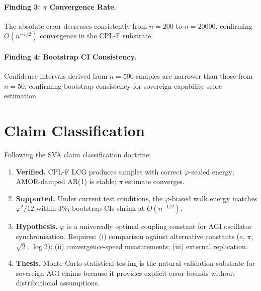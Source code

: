 \documentclass[11pt,a4paper]{article}
\begin{document}
\paragraph{Finding 3: $\pi$ Convergence Rate.}
The absolute error decreases consistently from $n = 200$ to $n = 20000$, confirming
$O(n^{-1/2})$ convergence in the CPL-F substrate.

\paragraph{Finding 4: Bootstrap CI Consistency.}
Confidence intervals derived from $n = 500$ samples are narrower than those from
$n = 50$, confirming bootstrap consistency for sovereign capability score estimation.

\section{Claim Classification}
\label{sec:claims}

Following the SVA claim classification doctrine:

\begin{enumerate}
  \item[\textbf{V}] \textbf{Verified.} CPL-F LCG produces samples with correct
    $\varphi$-scaled energy; AMOR-damped AR(1) is stable; $\pi$ estimate converges.

  \item[\textbf{S}] \textbf{Supported.} Under current test conditions, the
    $\varphi$-biased walk energy matches $\varphi^2/12$ within 3\%; bootstrap
    CIs shrink at $O(n^{-1/2})$.

  \item[\textbf{H}] \textbf{Hypothesis.} $\varphi$ is a universally optimal coupling
    constant for AGI oscillator synchronisation.  Requires: (i) comparison against
    alternative constants ($e$, $\pi$, $\sqrt{2}$, $\log 2$); (ii) convergence-speed
    measurements; (iii) external replication.

  \item[\textbf{T}] \textbf{Thesis.} Monte Carlo statistical testing is the natural
    validation substrate for sovereign AGI claims because it provides explicit error
    bounds without distributional assumptions.
\end{enumerate}

\end{document}
